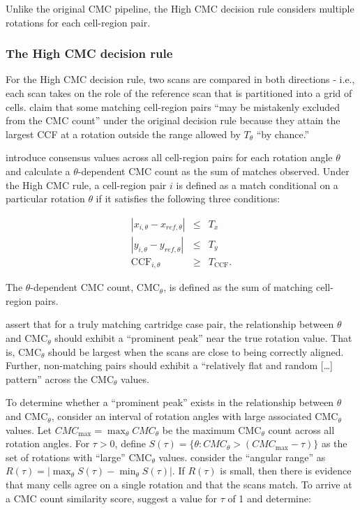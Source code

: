 \documentclass[11pt,]{isuthesis}
\begin{document}
Unlike the original CMC pipeline, the High CMC decision rule considers multiple rotations for each cell-region pair.

\hypertarget{highCMCMethod}{%
\subsubsection{The High CMC decision rule}\label{highCMCMethod}}

For the High CMC decision rule, two scans are compared in both directions - i.e., each scan takes on the role of the reference scan that is partitioned into a grid of cells.
\citet{tong_improved_2015} claim that some matching cell-region pairs ``may be mistakenly excluded from the CMC count'' under the original decision rule because they attain the largest CCF at a rotation outside the range allowed by \(T_\theta\) ``by chance.''

\citet{tong_improved_2015} introduce consensus values across all cell-region pairs for each rotation angle \(\theta\) and calculate a \(\theta\)-dependent CMC count as the sum of matches observed.
Under the High CMC rule, a cell-region pair \(i\) is defined as a match conditional on a particular rotation \(\theta\) if it satisfies the following three conditions:

\begin{eqnarray}
|x_{i,\theta} - x_{ref,\theta}| &\leq& T_x \\ \nonumber
|y_{i,\theta} - y_{ref,\theta}| &\leq& T_y \\ \nonumber
\text{CCF}_{i,\theta} &\geq& T_{\text{CCF}}.
\label{eq:highCMC}
\end{eqnarray}

The \(\theta\)-dependent CMC count, CMC\(_\theta\), is defined as the sum of matching cell-region pairs.

\citet{tong_improved_2015} assert that for a truly matching cartridge case pair, the relationship between \(\theta\) and CMC\(_\theta\) should exhibit a ``prominent peak'' near the true rotation value.
That is, CMC\(_{\theta}\) should be largest when the scans are close to being correctly aligned.
Further, non-matching pairs should exhibit a ``relatively flat and random {[}\ldots{]} pattern'' across the CMC\(_{\theta}\) values.

To determine whether a ``prominent peak'' exists in the relationship between \(\theta\) and CMC\(_\theta\), \citet{tong_improved_2015} consider an interval of rotation angles with large associated CMC\(_\theta\) values.
Let \(CMC_{\text{max}} = \max_{\theta} CMC_{\theta}\) be the maximum CMC\(_\theta\) count across all rotation angles.
For \(\tau > 0\), define \(S(\tau) = \{\theta : CMC_\theta > (CMC_{\max} - \tau)\}\) as the set of rotations with ``large'' CMC\(_\theta\) values.
\citet{tong_improved_2015} consider the ``angular range'' as \(R(\tau) = |\max_{\theta} S(\tau) - \min_\theta S(\tau)|\).
If \(R(\tau)\) is small, then there is evidence that many cells agree on a single rotation and that the scans match.
To arrive at a CMC count similarity score, \citet{tong_improved_2015} suggest a value for \(\tau\) of 1 and determine:
\end{document}
